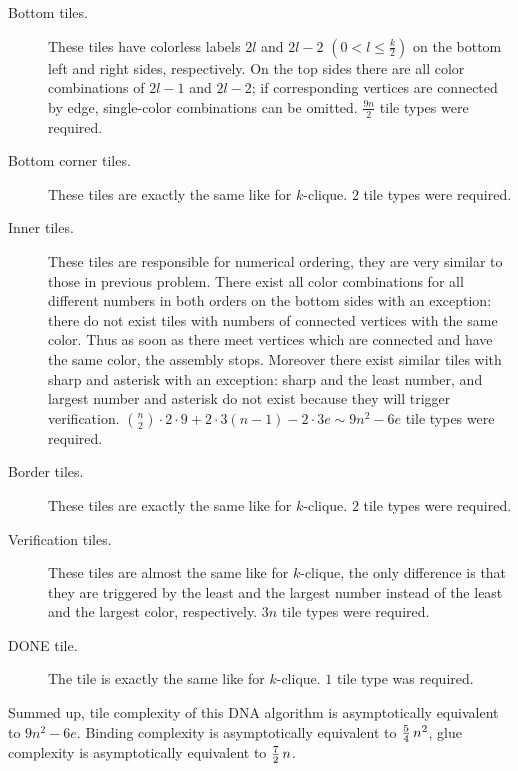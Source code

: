 \begin{description}
	\item[Bottom tiles.] These tiles have colorless labels $2l$ and $2l-2$ $(0 < l \leq \frac{k}{2})$ on the bottom left and right sides, respectively. On the top sides there are all color combinations of $2l-1$ and $2l-2$; if corresponding vertices are connected by edge, single-color combinations can be omitted. $\frac{9n}{2}$ tile types were required.
	\item[Bottom corner tiles.] These tiles are exactly the same like for $k$-clique. $2$ tile types were required.
	\item[Inner tiles.] These tiles are responsible for numerical ordering, they are very similar to those in previous problem. There exist all color combinations for all different numbers in both orders on the bottom sides with an exception: there do not exist tiles with numbers of connected vertices with the same color. Thus as soon as there meet vertices which are connected and have the same color, the assembly stops. Moreover there exist similar tiles with sharp and asterisk with an exception: sharp and the least number, and largest number and asterisk do not exist because they will trigger verification. $\binom{n}{2} \cdot 2 \cdot 9 + 2 \cdot 3 (n-1) - 2 \cdot 3 e \sim 9n^2 - 6e$ tile types were required.
	\item[Border tiles.] These tiles are exactly the same like for $k$-clique. $2$ tile types were required.
	\item[Verification tiles.] These tiles are almost the same like for $k$-clique, the only difference is that they are triggered by the least and the largest number instead of the least and the largest color, respectively. $3n$ tile types were required.
	\item[DONE tile.] The tile is exactly the same like for $k$-clique. $1$ tile type was required.
\end{description}

Summed up, tile complexity of this DNA algorithm is asymptotically equivalent to $9n^2 - 6e$. Binding complexity is asymptotically equivalent to $\nicefrac{5}{4}\,n^2$, glue complexity is asymptotically equivalent to $\nicefrac{7}{2}\,n$.

